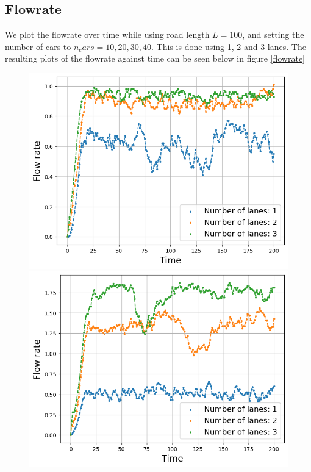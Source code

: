 \documentclass[a4paper,12pt]{article}
\begin{document}
\subsection*{Flowrate}
We plot the flowrate over time while using road length $L=100$, and setting the number of cars to $n_cars=10, 20, 30, 40$. This is done using 1, 2 and 3 lanes.
The resulting plots of the flowrate against time can be seen below in figure \ref*{flowrate}
\begin{figure}[H]
    \centering
    \begin{minipage}{.5\textwidth}
        \centering
        \includegraphics[scale=0.47]{Images/flowrate time 10 cars.png}
    \end{minipage}%
    \begin{minipage}{.5\textwidth}
        \centering
        \includegraphics[scale=0.47]{Images/flowrate time 20 cars.png}

\end{minipage}
\end{figure}
\end{document}
